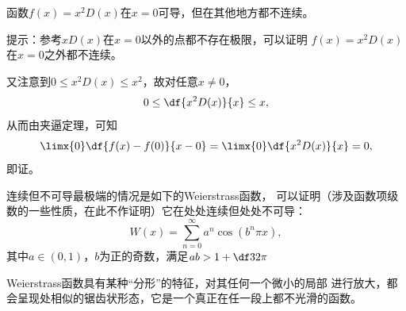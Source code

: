 \bs
\egz 函数$f(x)=x^2D(x)$在$x=0$可导，但在其他地方都不连续。

提示：参考$xD(x)$在$x=0$以外的点都不存在极限，可以证明
$f(x)=x^2D(x)$在$x=0$之外都不连续。

又注意到$0\leq x^2D(x)\leq x^2$，故对任意$x\ne 0$，
$$0\leq \df{x^2D(x)}{x}\leq x,$$
从而由夹逼定理，可知
$$\limx{0}\df{f(x)-f(0)}{x-0}=\limx{0}\df{x^2D(x)}{x}=0,$$
即证。
\fin

\begin{shaded}
	连续但不可导最极端的情况是如下的{\kaishu Weierstrass函数}，
	可以证明（涉及函数项级数的一些性质，在此不作证明）它在处处连续但处处不可导：	
	$$W(x)=\sum\limits_{n=0}^{\infty}a^n\cos(b^n\pi x),$$
	其中$a\in(0,1)$，$b$为正的奇数，满足$ab>1+\df32\pi$
	\begin{center}
		
		\kaishu Weierstrass函数具有某种“分形”的特征，对其任何一个微小的局部
		进行放大，都会呈现处相似的锯齿状形态，它是一个真正在任一段上都不光滑的函数。
	\end{center}


\end{shaded}
